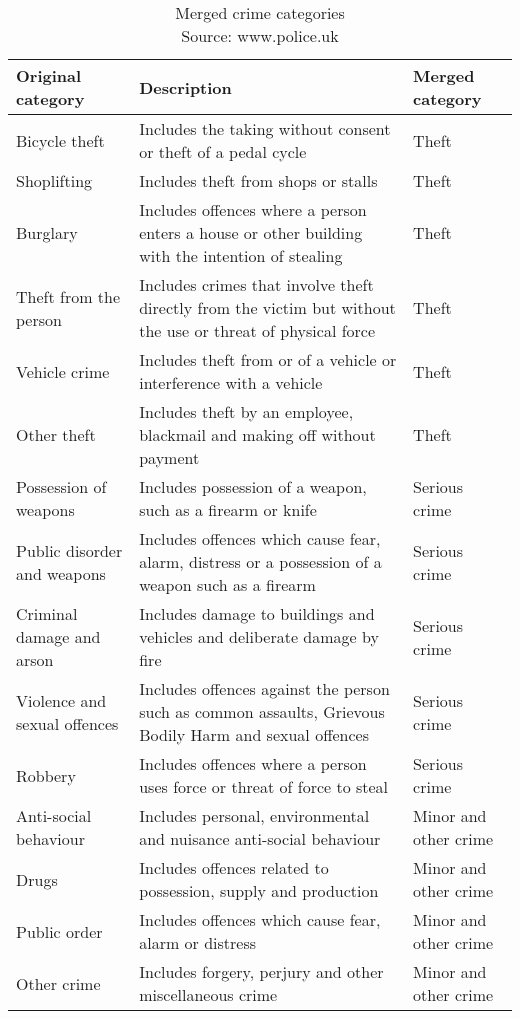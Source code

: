 \documentclass{article}
\begin{document}
	\begin{longtable}{|p{1.8cm}|p{7cm}|p{1.8cm}|}
		\caption{Merged crime categories \\ Source: www.police.uk}
		\label{tab:new-target-labels} \\
		\hline
		{\bf Original category} & {\bf Description}  & {\bf Merged category} \\ \hline
		\endhead
		Bicycle theft & Includes the taking without consent or theft of a pedal cycle & Theft \\ \hline
		Shoplifting & Includes theft from shops or stalls & Theft \\ \hline
		Burglary & Includes offences where a person enters a house or other building with the intention of stealing & Theft \\ \hline
		Theft from the person & Includes crimes that involve theft directly from the victim but without the use or threat of physical force & Theft \\ \hline
		Vehicle crime & Includes theft from or of a vehicle or interference with a vehicle & Theft \\ \hline
		Other theft & Includes theft by an employee, blackmail and making off without payment & Theft \\ \hline
		Possession of weapons & Includes possession of a weapon, such as a firearm or knife & Serious crime \\ \hline
		Public disorder and weapons & Includes offences which cause fear, alarm, distress or a possession of a weapon such as a firearm & Serious crime \\ \hline
		Criminal damage and arson & Includes damage to buildings and vehicles and deliberate damage by fire & Serious crime \\ \hline
		Violence and sexual offences & Includes offences against the person such as common assaults, Grievous Bodily Harm and sexual offences & Serious crime \\ \hline
		Robbery & Includes offences where a person uses force or threat of force to steal & Serious crime \\ \hline
		Anti-social behaviour & Includes personal, environmental and nuisance anti-social behaviour & Minor and other crime \\ \hline
		Drugs & Includes offences related to possession, supply and production & Minor and other crime \\ \hline
		Public order & Includes offences which cause fear, alarm or distress & Minor and other crime \\ \hline
		Other crime & Includes forgery, perjury and other miscellaneous crime & Minor and other crime \\ \hline
	\end{longtable}
\end{document}
